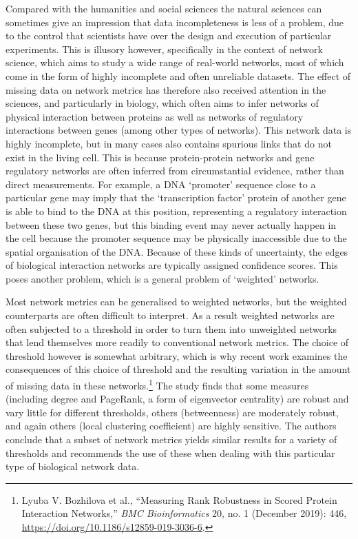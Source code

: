 \documentclass[]{article}
\begin{document}
Compared with the humanities and social sciences the natural sciences can sometimes give an impression that data incompleteness is less of a problem, due to the control that scientists have over the design and execution of particular experiments. This is illusory however, specifically in the context of network science, which aims to study a wide range of real-world networks, most of which come in the form of highly incomplete and often unreliable datasets. The effect of missing data on network metrics has therefore also received attention in the sciences, and particularly in biology, which often aims to infer networks of physical interaction between proteins as well as networks of regulatory interactions between genes (among other types of networks). This network data is highly incomplete, but in many cases also contains spurious links that do not exist in the living cell. This is because protein-protein networks and gene regulatory networks are often inferred from circumstantial evidence, rather than direct measurements. For example, a DNA `promoter' sequence close to a particular gene may imply that the `transcription factor' protein of another gene is able to bind to the DNA at this position, representing a regulatory interaction between these two genes, but this binding event may never actually happen in the cell because the promoter sequence may be physically inaccessible due to the spatial organisation of the DNA. Because of these kinds of uncertainty, the edges of biological interaction networks are typically assigned confidence scores. This poses another problem, which is a general problem of `weighted' networks.

Most network metrics can be generalised to weighted networks, but the weighted counterparts are often difficult to interpret. As a result weighted networks are often subjected to a threshold in order to turn them into unweighted networks that lend themselves more readily to conventional network metrics. The choice of threshold however is somewhat arbitrary, which is why recent work examines the consequences of this choice of threshold and the resulting variation in the amount of missing data in these networks.\footnote{Lyuba V. Bozhilova et al., ``Measuring Rank Robustness in Scored Protein Interaction Networks,'' \emph{BMC Bioinformatics} 20, no. 1 (December 2019): 446, \url{https://doi.org/10.1186/s12859-019-3036-6}.} The study finds that some measures (including degree and PageRank, a form of eigenvector centrality) are robust and vary little for different thresholds, others (betweenness) are moderately robust, and again others (local clustering coefficient) are highly sensitive. The authors conclude that a subset of network metrics yields similar results for a variety of thresholds and recommends the use of these when dealing with this particular type of biological network data.
\end{document}
